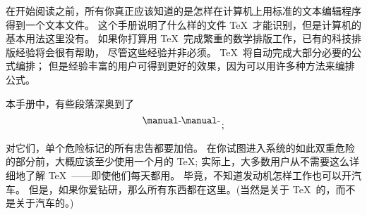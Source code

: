 {%
在开始阅读之前，所有你真正应该知道的是怎样在计算机上用标准的文本编辑程序%
得到一个文本文件。%
这个手册说明了什么样的文件 \TeX\ 才能识别，但是计算机的基本用法这里没有。%
如果你打算用 \TeX\ 完成繁重的数学排版工作，已有的科技排版经验将会很有帮助，
尽管这些经验并非必须。
\TeX\ 将自动完成大部分必要的公式编排；%
但是经验丰富的用户可得到更好的效果，因为可以用许多种方法来编排公式。

本手册中，有些段落深奥到了
$$\vcenter{\hbox{\dbend\kern1pt\dbend}\vskip 11pt}\;;$$
对它们，单个危险标记的所有忠告都要加倍。%
在你试图进入系统的如此双重危险的部分前，大概应该至少使用一个月的 \TeX; %
实际上，大多数用户从不需要这么详细地了解 \TeX\ ——即使他们每天都用。%
毕竟，不知道发动机怎样工作也可以开汽车。%
但是，如果你爱钻研，那么所有东西都在这里。(当然是关于 \TeX\ 的，而不是关于汽车的。)

}
